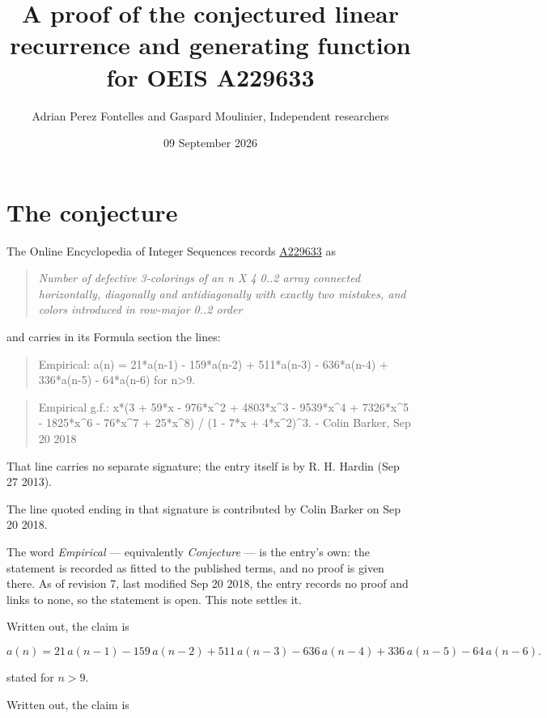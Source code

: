 \documentclass[11pt]{article}
\title{A proof of the conjectured linear recurrence and generating function for OEIS A229633}
\author{Adrian Perez Fontelles and Gaspard Moulinier, Independent researchers}
\date{09 September 2026}
\theoremstyle{definition}
\begin{document}
\maketitle
\section{The conjecture}

The Online Encyclopedia of Integer Sequences records \href{https://oeis.org/A229633}{A229633} as

\begin{quote}\itshape Number of defective 3-colorings of an n X 4 0..2 array connected horizontally, diagonally and antidiagonally with exactly two mistakes, and colors introduced in row-major 0..2 order\end{quote}

and carries in its Formula section the lines:

\begin{quote}\ttfamily Empirical: a(n) = 21*a(n-1) - 159*a(n-2) + 511*a(n-3) - 636*a(n-4) + 336*a(n-5) - 64*a(n-6) for n>9.\end{quote}

\begin{quote}\ttfamily Empirical g.f.: x*(3 + 59*x - 976*x\textasciicircum{}2 + 4803*x\textasciicircum{}3 - 9539*x\textasciicircum{}4 + 7326*x\textasciicircum{}5 - 1825*x\textasciicircum{}6 - 76*x\textasciicircum{}7 + 25*x\textasciicircum{}8) / (1 - 7*x + 4*x\textasciicircum{}2)\textasciicircum{}3. - Colin Barker, Sep 20 2018\end{quote}

That line carries no separate signature; the entry itself is by R. H. Hardin (Sep 27 2013).

The line quoted ending in that signature is contributed by Colin Barker on Sep 20 2018.

The word {\itshape Empirical} --- equivalently {\itshape Conjecture} --- is the entry's own: the statement is recorded as fitted to the published terms, and no proof is given there. As of revision 7, last modified Sep 20 2018, the entry records no proof and links to none, so the statement is open. This note settles it.

Written out, the claim is

\[a(n) = 21\,a(n-1) - 159\,a(n-2) + 511\,a(n-3) - 636\,a(n-4) + 336\,a(n-5) - 64\,a(n-6).\]

stated for $n > 9$.

Written out, the claim is
\end{document}
